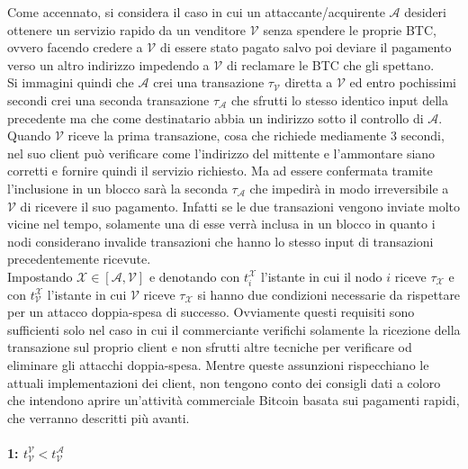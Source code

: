Come accennato, si considera il caso in cui un attaccante/acquirente $\mathcal{A}$ desideri ottenere un servizio rapido da un venditore $\mathcal{V}$ senza spendere le proprie BTC, ovvero facendo credere a $\mathcal{V}$ di essere stato pagato salvo poi deviare il pagamento verso un altro indirizzo impedendo a $\mathcal{V}$ di reclamare le BTC che gli spettano.\\
Si immagini quindi che $\mathcal{A}$ crei una transazione $\tau_\mathcal{V}$ diretta a $\mathcal{V}$ ed entro pochissimi secondi crei una seconda transazione $\tau_\mathcal{A}$ che sfrutti lo stesso identico input della precedente ma che come destinatario abbia un indirizzo sotto il controllo di $\mathcal{A}$. Quando $\mathcal{V}$ riceve la prima transazione, cosa che richiede mediamente 3 secondi, nel suo client può verificare come l'indirizzo del mittente e l'ammontare siano corretti e fornire quindi il servizio richiesto. Ma ad essere confermata tramite l'inclusione in un blocco sarà la seconda $\tau_\mathcal{A}$ che impedirà in modo irreversibile a $\mathcal{V}$ di ricevere il suo pagamento. Infatti se le due transazioni vengono inviate molto vicine nel tempo, solamente una di esse verrà inclusa in un blocco in quanto i nodi considerano invalide transazioni che hanno lo stesso input di transazioni precedentemente ricevute.\\
Impostando $\mathcal{X} \in \left[ \mathcal{A}, \mathcal{V} \right]$ e denotando con $t^\mathcal{X}_i$ l'istante in cui il nodo $i$ riceve $\tau_\mathcal{X}$ e con $t^\mathcal{X}_\mathcal{V}$ l'istante in cui $\mathcal{V}$ riceve $\tau_\mathcal{X}$ si hanno due condizioni necessarie da rispettare per un attacco doppia-spesa di successo. Ovviamente questi requisiti sono sufficienti solo nel caso in cui il commerciante verifichi solamente la ricezione della transazione sul proprio client e non sfrutti altre tecniche per verificare od eliminare gli attacchi doppia-spesa. Mentre queste assunzioni rispecchiano le attuali implementazioni dei client, non tengono conto dei consigli dati a coloro che intendono aprire un'attività commerciale Bitcoin basata sui pagamenti rapidi, che verranno descritti più avanti.

\paragraph{1: $t^\mathcal{V}_\mathcal{V} < t^\mathcal{A}_\mathcal{V}$}

